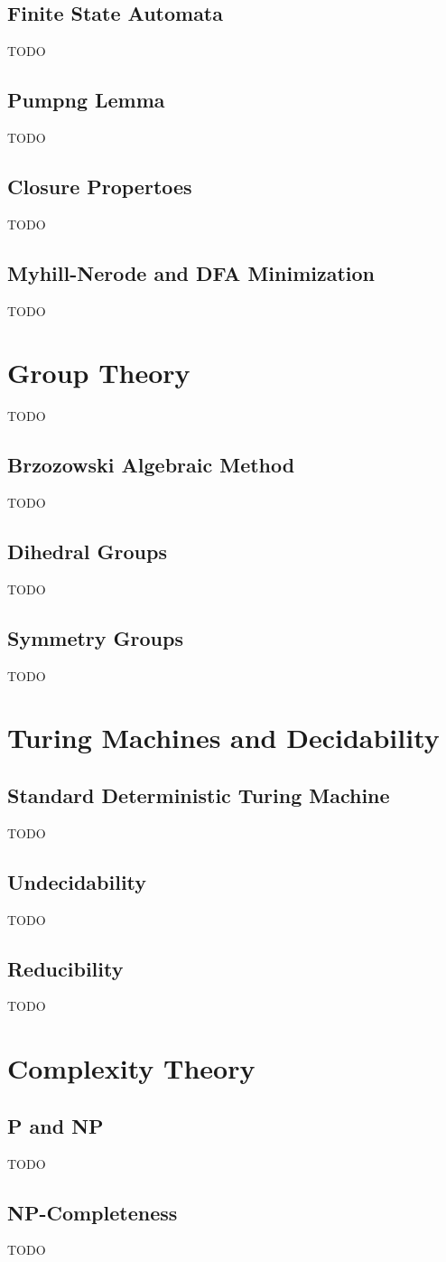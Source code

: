 \documentclass{article}
\begin{document}
 \subsection{Finite State Automata}
TODO

\subsection{Pumpng Lemma}
TODO

\subsection{Closure Propertoes}
TODO

\subsection{Myhill-Nerode and DFA Minimization}
TODO

\section{Group Theory}
TODO

\subsection{Brzozowski Algebraic Method}
TODO

\subsection{Dihedral Groups}
TODO

\subsection{Symmetry Groups}
TODO

\section{Turing Machines and Decidability}

\subsection{Standard Deterministic Turing Machine}
TODO

\subsection{Undecidability}
TODO

\subsection{Reducibility}
TODO

\section{Complexity Theory}

\subsection{P and NP}
TODO

\subsection{NP-Completeness}
TODO
\end{document}
